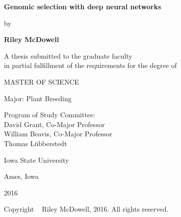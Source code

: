 \begin{titlepage}
\begin{center}

\textbf{Genomic selection with deep neural networks}

\vspace{0.5cm}

by

\vspace{0.5cm}

\textbf{Riley McDowell}

\vspace{2.0cm}

A thesis submitted to the graduate faculty \\ 
in partial fulfillment of the requirements for the degree of

\vspace{0.5cm}

MASTER OF SCIENCE 

\vspace{2.0cm}

Major: Plant Breeding

\vspace{0.5cm}

Program of Study Committee: \\
David Grant, Co-Major Professor \\
William Beavis, Co-Major Professor \\
Thomas L{\"u}bberstedt \\

\vspace{5.0cm}

Iowa State University

\vspace{0.5cm}

Ames, Iowa

\vspace{0.5cm}

2016

\vspace{1.0cm}

Copyright \textcopyright~ Riley McDowell, 2016. All rights reserved.

\end{center}
\end{titlepage}
